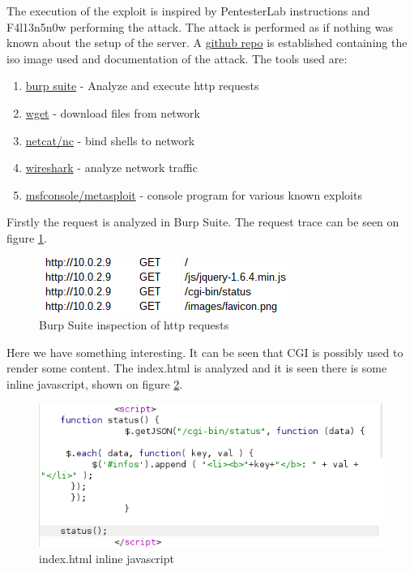 The execution of the exploit is inspired by PentesterLab instructions and F4l13n5n0w\cite{fallensnow} performing the attack. The attack is performed as if nothing was known about the setup of the server. A \href{https://github.com/mlRosenquist/au-syssec-e21-grp8-assignment3}{github repo} is established containing the iso image used and documentation of the attack. The tools used are: 
\begin{enumerate}
    \item \href{https://portswigger.net/burp}{burp suite} - Analyze and execute http requests 
    \item \href{https://www.gnu.org/software/wget/manual/wget.html}{wget} - download files from network
    \item \href{http://netcat.sourceforge.net/}{netcat/nc} - bind shells to network
    \item \href{https://www.wireshark.org/}{wireshark} - analyze network traffic
    \item \href{https://www.offensive-security.com/metasploit-unleashed/msfconsole/}{msfconsole/metasploit} - console program for various known exploits
\end{enumerate}

Firstly the request is analyzed in Burp Suite. The request trace can be seen on figure \ref{fig:http-requests}. 

\begin{figure} [ht]
    \centering
    \includegraphics[width=\columnwidth]{../pictures/http-requests.png}
    \caption{Burp Suite inspection of http requests}
    \label{fig:http-requests}
\end{figure}


Here we have something interesting. It can be seen that CGI is possibly used to render some content. The index.html is analyzed and it is seen there is some inline javascript, shown on figure \ref{fig:inline-js}.

\begin{figure} [ht]
    \centering
    \includegraphics[width=\columnwidth]{../pictures/html-inline-js-script.png}
    \caption{index.html inline javascript}
    \label{fig:inline-js}
\end{figure}


